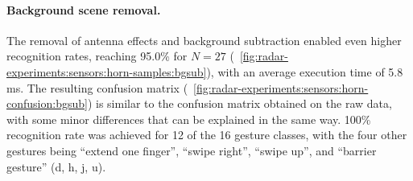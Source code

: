 \paragraph{Background scene removal.}
The removal of antenna effects and background subtraction enabled even higher recognition rates, reaching 95.0\% for $N{=}27$ (\fig~\ref{fig:radar-experiments:sensors:horn-samples:bgsub}), with an average execution time of 5.8 ms. The resulting confusion matrix (\fig~\ref{fig:radar-experiments:sensors:horn-confusion:bgsub}) is similar to the confusion matrix obtained on the raw data, with some minor differences that can be explained in the same way. 100\% recognition rate was achieved for 12 of the 16 gesture classes, with the four other gestures being ``extend one finger'', ``swipe right'', ``swipe up'', and ``barrier gesture'' (d, h, j, u).

